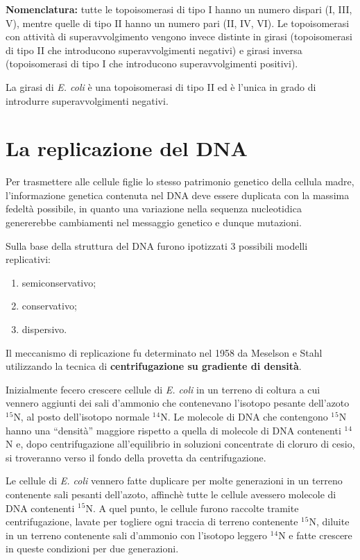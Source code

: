 \documentclass[11pt]{book}
\begin{document}
\textbf{Nomenclatura:} tutte le topoisomerasi di tipo I hanno un numero
dispari (I, III, V), mentre quelle di tipo II hanno un numero pari (II,
IV, VI). Le topoisomerasi con attività di superavvolgimento vengono
invece distinte in girasi (topoisomerasi di tipo II che introducono
superavvolgimenti negativi) e girasi inversa (topoisomerasi di tipo I
che introducono superavvolgimenti positivi).

La girasi di \emph{E. coli} è una topoisomerasi di tipo II ed è l'unica
in grado di introdurre superavvolgimenti negativi.

\section{La replicazione del DNA}\label{la-replicazione-del-dna}

Per trasmettere alle cellule figlie lo stesso patrimonio genetico della
cellula madre, l'informazione genetica contenuta nel DNA deve essere
duplicata con la massima fedeltà possibile, in quanto una variazione
nella sequenza nucleotidica genererebbe cambiamenti nel messaggio
genetico e dunque mutazioni.

Sulla base della struttura del DNA furono ipotizzati 3 possibili modelli
replicativi:

\begin{enumerate}
\def\labelenumi{\arabic{enumi}.}
\itemsep1pt\parskip0pt
\item
  semiconservativo;
\item
  conservativo;
\item
  dispersivo.
\end{enumerate}

Il meccanismo di replicazione fu determinato nel 1958 da Meselson e
Stahl utilizzando la tecnica di \textbf{centrifugazione su gradiente di
densità}.

Inizialmente fecero crescere cellule di \emph{E. coli} in un terreno di
coltura a cui vennero aggiunti dei sali d'ammonio che contenevano
l'isotopo pesante dell'azoto \(^1\)\(^5\)N, al posto dell'isotopo
normale \(^1\)\(^4\)N. Le molecole di DNA che contengono \(^1\)\(^5\)N
hanno una ``densità'' maggiore rispetto a quella di molecole di DNA
contenenti \(^1\)\(^4\)N e, dopo centrifugazione all'equilibrio in
soluzioni concentrate di cloruro di cesio, si troveranno verso il fondo
della provetta da centrifugazione.

Le cellule di \emph{E. coli} vennero fatte duplicare per molte
generazioni in un terreno contenente sali pesanti dell'azoto, affinchè
tutte le cellule avessero molecole di DNA contenenti \(^1\)\(^5\)N. A
quel punto, le cellule furono raccolte tramite centrifugazione, lavate
per togliere ogni traccia di terreno contenente \(^1\)\(^5\)N, diluite
in un terreno contenente sali d'ammonio con l'isotopo leggero
\(^1\)\(^4\)N e fatte crescere in queste condizioni per due generazioni.
\end{document}
